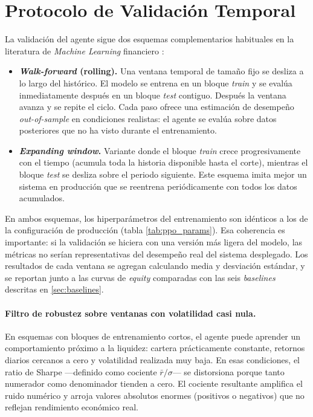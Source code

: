 \documentclass[IB,a4paper]{TFUOC}
\begin{document}
\section{Protocolo de Validación Temporal}
\label{sec:validacion}

La validación del agente sigue dos esquemas complementarios habituales en la literatura de \textit{Machine Learning} financiero \citep{lopezdeprado2018}:

\begin{itemize}
    \item \textbf{\textit{Walk-forward} (rolling).} Una ventana temporal de tamaño fijo se desliza a lo largo del histórico. El modelo se entrena en un bloque \textit{train} y se evalúa inmediatamente después en un bloque \textit{test} contiguo. Después la ventana avanza y se repite el ciclo. Cada paso ofrece una estimación de desempeño \textit{out-of-sample} en condiciones realistas: el agente se evalúa sobre datos posteriores que no ha visto durante el entrenamiento.
    \item \textbf{\textit{Expanding window}.} Variante donde el bloque \textit{train} crece progresivamente con el tiempo (acumula toda la historia disponible hasta el corte), mientras el bloque \textit{test} se desliza sobre el periodo siguiente. Este esquema imita mejor un sistema en producción que se reentrena periódicamente con todos los datos acumulados.
\end{itemize}

En ambos esquemas, los hiperparámetros del entrenamiento son idénticos a los de la configuración de producción (tabla \ref{tab:ppo_params}). Esa coherencia es importante: si la validación se hiciera con una versión más ligera del modelo, las métricas no serían representativas del desempeño real del sistema desplegado. Los resultados de cada ventana se agregan calculando media y desviación estándar, y se reportan junto a las curvas de \textit{equity} comparadas con las seis \textit{baselines} descritas en \ref{sec:baselines}.

\paragraph{Filtro de robustez sobre ventanas con volatilidad casi nula.} En esquemas con bloques de entrenamiento cortos, el agente puede aprender un comportamiento próximo a la liquidez: cartera prácticamente constante, retornos diarios cercanos a cero y volatilidad realizada muy baja. En esas condiciones, el ratio de Sharpe ---definido como cociente $\bar{r}/\sigma$--- se distorsiona porque tanto numerador como denominador tienden a cero. El cociente resultante amplifica el ruido numérico y arroja valores absolutos enormes (positivos o negativos) que no reflejan rendimiento económico real.
\end{document}
